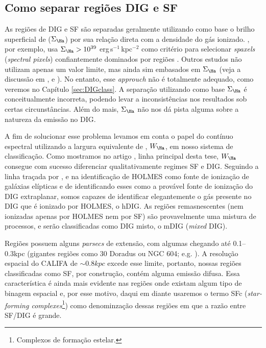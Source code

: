 \subsection{Como separar regiões DIG e SF}
\label{sec:intro:DIG:class}
As regiões de DIG e SF são separadas geralmente utilizando como base o brilho superficial de \Ha ($\Sigma_{\Ha}$) por sua relação direta com a densidade do gás ionizado. \citet{Zhang.etal.2017a}, por exemplo, usa $\Sigma_{\Ha} > 10^{39}$ erg$\,$s$^{-1}\,$kpc$^{-2}$ como critério para selecionar {\em spaxels} ({\em spectral pixels}) confiantemente dominados por regiões \hii. Outros estudos não utilizam apenas um valor limite, mas ainda sim embasados em $\Sigma_{\Ha}$ (veja a discussão em \citealt{Zurita.etal.2000}, \citealt{Oey.etal.2007} e \citealt{Vogt.etal.2017a}). No entanto, esse {\em approuch} não é totalmente adequado, como veremos no Capítulo \ref{sec:DIGclass}. A separação utilizando como base $\Sigma_{\Ha}$ é conceitualmente incorreta, podendo levar a inconsistências nos resultados sob certas circunstâncias. Além do mais, $\Sigma_{\Ha}$ não nos dá pista alguma sobre a natureza da emissão no DIG.

A fim de solucionar esse problema levamos em conta o papel do contínuo espectral utilizando a largura equivalente de \Ha, $W_{\Ha}$, em nosso sistema de classificação. Como mostramos no artigo \citet[][Apêndice \ref{apendice:DIGpaper0}]{Lacerda.etal.2018}, linha principal desta tese, $W_{\Ha}$ consegue com sucesso diferenciar qualitativamente regimes SF e DIG. Seguindo a linha traçada por \citet{Binette.etal.1994a}, \citet{Stasinska.etal.2008a} e \citet{CidFernandes.etal.2011a} na identificação de HOLMES como fonte de ionização de galáxias elípticas e de \citet{FloresFajardo.etal.2011a} identificando esses como a provável fonte de ionização do DIG extraplanar, somos capazes de identificar elegantemente o gás presente no DIG que é ionizado por HOLMES, o hDIG. As regiões remasnescentes (nem ionizadas apenas por HOLMES nem por SF) são provavelmente uma mistura de processos, e serão classificadas como DIG misto, o mDIG ({\em mixed} DIG).

Regiões \hii possuem alguns {\em parsecs} de extensão, com algumas chegando até 0.1--0.3kpc (gigantes regiões como 30 Doradus ou NGC 604; e.g. \citealt{Rosa.y.Enrique.2000}). A resolução espacial do CALIFA de $\sim 0.8kpc$ excede esse limite, portanto, nossas regiões classificadas como SF, por construção, contém alguma emissão difusa. Essa característica é ainda mais evidente nas regiões onde existam algum tipo de binagem espacial e, por esse motivo, daqui em diante usaremos o termo SFc ({\em star-forming complexes}\footnote{Complexos de formação estelar.}) como denominzação dessas regiões em que a razão entre SF/DIG é grande.


